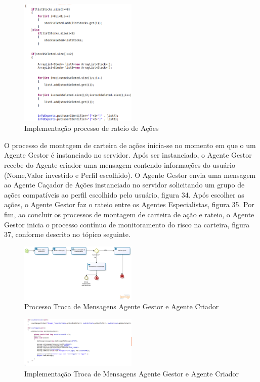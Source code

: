 \begin{figure}[h]
\centering
\label{f33}
\includegraphics[width=0.5\textwidth]{figuras/f33}
\caption{Implementação processo de rateio de Ações}
\end{figure}


O processo de montagem de carteira de ações inicia-se no momento em que o um Agente Gestor é instanciado no servidor. Após ser instanciado, o Agente Gestor recebe do Agente criador uma mensagem contendo informações do usuário (Nome,Valor investido e Perfil escolhido). O Agente Gestor envia uma mensagem ao Agente Caçador de Ações instanciado no servidor solicitando um grupo de ações compatíveis ao perfil escolhido pelo usuário, figura 34. Após escolher as ações, o Agente Gestor faz o rateio entre os Agentes Especialistas, figura 35. Por fim, ao concluir os processos de montagem de carteira de ação e rateio, o Agente Gestor inicia o processo contínuo de monitoramento do risco na carteira, figura 37, conforme descrito no tópico seguinte.


\begin{figure}[h]
\centering
\label{f34}
\includegraphics[width=0.5\textwidth]{figuras/f34}
\caption{Processo Troca de Mensagens Agente Gestor e Agente Criador}
\end{figure}

\begin{figure}[h]
\centering
\label{f35}
\includegraphics[width=0.5\textwidth]{figuras/f35}
\caption{Implementação Troca de Mensagens Agente Gestor e Agente Criador}
\end{figure}

